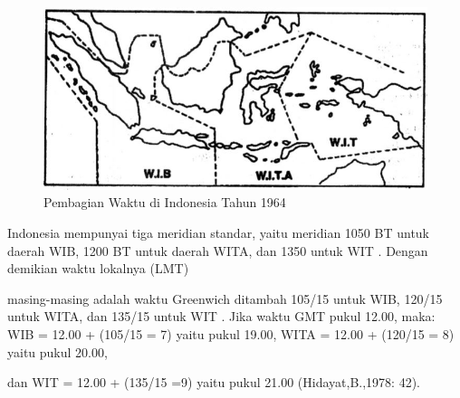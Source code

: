  
 \begin{figure}[ht]
 \centerline{\includegraphics[width=1\textwidth]{figures/sejarahwaktu_indo64}}
 \caption{Pembagian Waktu di Indonesia Tahun 1964}
 \label{sejarahwaktu_Capture2}
 \end{figure}
 


Indonesia mempunyai tiga meridian standar, yaitu meridian 1050 BT untuk daerah WIB, 
 1200 BT untuk daerah WITA, dan 1350 untuk WIT .  Dengan demikian waktu lokalnya (LMT) 

 masing-masing adalah waktu Greenwich 
 ditambah 105/15 untuk WIB, 120/15 untuk WITA, dan 135/15 untuk WIT .
 Jika waktu GMT pukul 12.00, maka: WIB = 12.00 + (105/15 = 7) yaitu pukul 19.00,
 WITA = 12.00 + (120/15 = 8) yaitu pukul 20.00, 

 dan WIT = 12.00 + (135/15 =9) yaitu pukul 21.00 (Hidayat,B.,1978: 42).
